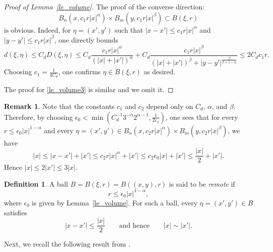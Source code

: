 \documentclass[12pt]{amsart}
\theoremstyle{plain}
\theoremstyle{definition}
\newtheorem{definition}[theorem]{Definition}
\newtheorem{remark}[theorem]{Remark}
\numberwithin{equation}{section}
\begin{document}
\begin{proof}[Proof of Lemma~\ref{le_volume}]
The proof of the converse direction:
\begin{equation}
    B_n(x, c_1 r |x|^\alpha) \times B_m(y, c_1 r |x|^\beta) \subset B(\xi, r)
\end{equation}
is obvious. Indeed, for $ \eta = (x',y')$ such that $|x-x'|\le c_1 r |x|^\alpha$ and $|y-y'|\le c_1 r |x|^\beta$, one directly bounds
\begin{equation*}
    d(\xi,\eta)\le C_d D(\xi,\eta)\le C_d \frac{c_1 r |x|^\alpha}{\left(|x|+|x'|\right)^\alpha} + C_d \frac{c_1 r |x|^\beta}{\left(|x|+|x'|\right)^\beta+|y-y'|^{\frac{\beta}{\beta+1-\alpha}}} \le 2 C_d c_1 r.
\end{equation*}
Choosing $c_1 = \frac{1}{4C_d}$, one confirms $\eta \in B(\xi,r)$ as desired.

The proof for \eqref{le_volume3} is similar and we omit it.
\end{proof}




\begin{remark}
Note that the constants \(c_1\) and \(c_2\) depend only on \(C_d\), \(\alpha\), and \(\beta\). Therefore, by choosing $\epsilon_0< \min \left( C_d^{-1} 3^{-\alpha} 2^{\alpha-1}, \frac{1}{2c_2} \right)$, one sees that for every \(r\le \epsilon_0 |x|^{1-\alpha}\) and every $\eta=(x',y')\in B_n(x, c_2 r |x|^\alpha)\times B_m(y, c_2 r |x|^\beta)$, we have
\[
|x|\le |x-x'|+|x'|
\le c_2 r |x|^\alpha + |x'|
\le c_2\epsilon_0 |x|+|x'|
\le \frac{|x|}{2}+|x'|.
\]
Hence $|x|\le 2|x'|\le 3|x|$.
\end{remark}
    

\begin{definition}
A ball \(B=B(\xi,r)=B((x,y),r)\) is said to be \emph{remote} if
\[
r\le \epsilon_0 |x|^{1-\alpha},
\]
where \(\epsilon_0\) is given by Lemma~\ref{le_volume}. For such a ball, every \(\eta=(x',y')\in B\) satisfies
\[
|x-x'|\le \frac{|x|}{2}
\qquad\text{and hence}\qquad
|x|\sim |x'|.
\]
\end{definition}



Next, we recall the following result from \cite[Theorem~3.1, Proposition~3.5]{BCLS}.
\end{document}
